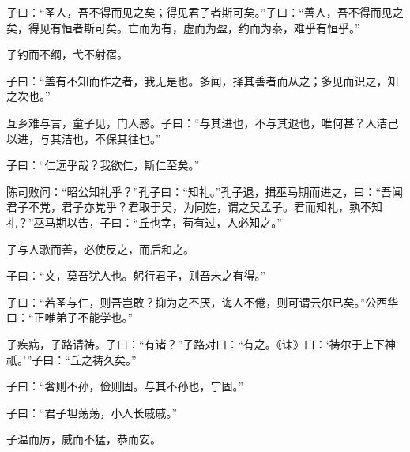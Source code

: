 \documentclass[12pt,a4paper]{ctexbook}
\begin{document}
子曰：“圣人，吾不得而见之矣；得见君子者斯可矣。”子曰：“善人，吾不得而见之矣，得见有恒者斯可矣。亡而为有，虚而为盈，约而为泰，难乎有恒乎。”\par
子钓而不纲，弋不射宿。\par
子曰：“盖有不知而作之者，我无是也。多闻，择其善者而从之；多见而识之，知之次也。”\par
互乡难与言，童子见，门人惑。子曰：“与其进也，不与其退也，唯何甚？人洁己以进，与其洁也，不保其往也。”\par
子曰：“仁远乎哉？我欲仁，斯仁至矣。”\par
陈司败问：“昭公知礼乎？”孔子曰：“知礼。”孔子退，揖巫马期而进之，曰：“吾闻君子不党，君子亦党乎？君取于吴，为同姓，谓之吴孟子。君而知礼，孰不知礼？”巫马期以告，子曰：“丘也幸，苟有过，人必知之。”\par
子与人歌而善，必使反之，而后和之。\par
子曰：“文，莫吾犹人也。躬行君子，则吾未之有得。”\par
子曰：“若圣与仁，则吾岂敢？抑为之不厌，诲人不倦，则可谓云尔已矣。”公西华曰：“正唯弟子不能学也。”\par
子疾病，子路请祷。子曰：“有诸？”子路对曰：“有之。《诔》曰：‘祷尔于上下神祇。’”子曰：“丘之祷久矣。”\par
子曰：“奢则不孙，俭则固。与其不孙也，宁固。”\par
子曰：“君子坦荡荡，小人长戚戚。”\par
子温而厉，威而不猛，恭而安。\par
\end{document}
